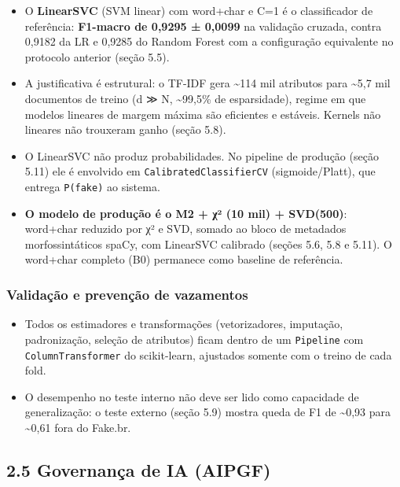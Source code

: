 \documentclass[
  brazilian,
  11pt,
]{article}
\providecommand{\tightlist}{%
  \setlength{\itemsep}{0pt}\setlength{\parskip}{0pt}}
\begin{document}
\begin{itemize}
\tightlist
\item
  O \textbf{LinearSVC} (SVM linear) com word+char e C=1 é o classificador de referência: \textbf{F1-macro de 0,9295 ± 0,0099} na validação cruzada, contra 0,9182 da LR e 0,9285 do Random Forest com a configuração equivalente no protocolo anterior (seção 5.5).
\item
  A justificativa é estrutural: o TF-IDF gera \textasciitilde114 mil atributos para \textasciitilde5,7 mil documentos de treino (d ≫ N, \textasciitilde99,5\% de esparsidade), regime em que modelos lineares de margem máxima são eficientes e estáveis. Kernels não lineares não trouxeram ganho (seção 5.8).
\item
  O LinearSVC não produz probabilidades. No pipeline de produção (seção 5.11) ele é envolvido em \texttt{CalibratedClassifierCV} (sigmoide/Platt), que entrega \texttt{P(fake)} ao sistema.
\item
  \textbf{O modelo de produção é o M2 + χ² (10 mil) + SVD(500)}: word+char reduzido por χ² e SVD, somado ao bloco de metadados morfossintáticos spaCy, com LinearSVC calibrado (seções 5.6, 5.8 e 5.11). O word+char completo (B0) permanece como baseline de referência.
\end{itemize}

\subsubsection{Validação e prevenção de vazamentos}\label{validauxe7uxe3o-e-prevenuxe7uxe3o-de-vazamentos}

\begin{itemize}
\tightlist
\item
  Todos os estimadores e transformações (vetorizadores, imputação, padronização, seleção de atributos) ficam dentro de um \texttt{Pipeline} com \texttt{ColumnTransformer} do scikit-learn, ajustados somente com o treino de cada fold.
\item
  O desempenho no teste interno não deve ser lido como capacidade de generalização: o teste externo (seção 5.9) mostra queda de F1 de \textasciitilde0,93 para \textasciitilde0,61 fora do Fake.br.
\end{itemize}

\subsection{2.5 Governança de IA (AIPGF)}\label{governanuxe7a-de-ia-aipgf}
\end{document}

